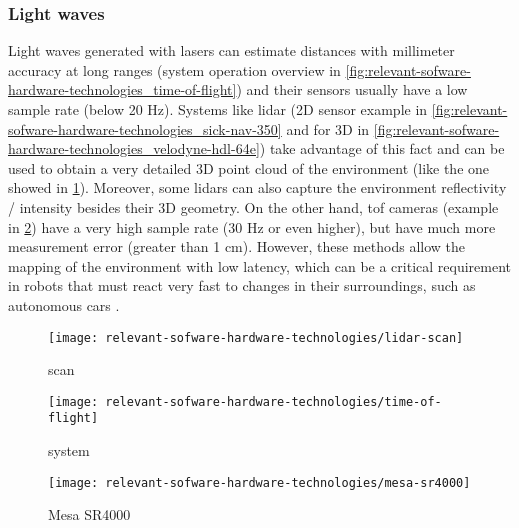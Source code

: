 \subsubsection{Light waves}

Light waves generated with lasers can estimate distances with millimeter accuracy at long ranges (system operation overview in \cref{fig:relevant-sofware-hardware-technologies_time-of-flight}) and their sensors usually have a low sample rate (below 20 Hz). Systems like \gls{lidar} (2D sensor example in \cref{fig:relevant-sofware-hardware-technologies_sick-nav-350} and for 3D in \cref{fig:relevant-sofware-hardware-technologies_velodyne-hdl-64e}) take advantage of this fact and can be used to obtain a very detailed 3D point cloud of the environment (like the one showed in \cref{fig:relevant-sofware-hardware-technologies_lidar-scan}). Moreover, some \glspl{lidar} can also capture the environment reflectivity / intensity besides their 3D geometry. On the other hand, \gls{tof} cameras (example in \cref{fig:relevant-sofware-hardware-technologies_mesa-sr4000}) have a very high sample rate (30 Hz or even higher), but have much more measurement error (greater than 1 cm). However, these methods allow the mapping of the environment with low latency, which can be a critical requirement in robots that must react very fast to changes in their surroundings, such as autonomous cars \cite{Moras2010}.

\begin{figure}[H]
	\centering
	\texttt{[image: relevant-sofware-hardware-technologies/lidar-scan]}
	\caption[ scan]{ scan\protect\footnotemark}
	\label{fig:relevant-sofware-hardware-technologies_lidar-scan}
\end{figure}


\begin{savenotes}
\begin{figure}[H]
	\centering
	\begin{minipage}[h]{.47\textwidth}
		\centering
		\texttt{[image: relevant-sofware-hardware-technologies/time-of-flight]}
		\caption[ system]{ system\protect\footnotemark}
		\label{fig:relevant-sofware-hardware-technologies_time-of-flight}
	\end{minipage}\hfill
{}
	\begin{minipage}[h]{.47\textwidth}
		\centering
		\texttt{[image: relevant-sofware-hardware-technologies/mesa-sr4000]}
		\caption[Mesa SR4000]{Mesa SR4000\protect\footnotemark}
		\label{fig:relevant-sofware-hardware-technologies_mesa-sr4000}
	\end{minipage}
\end{figure}
\end{savenotes}


